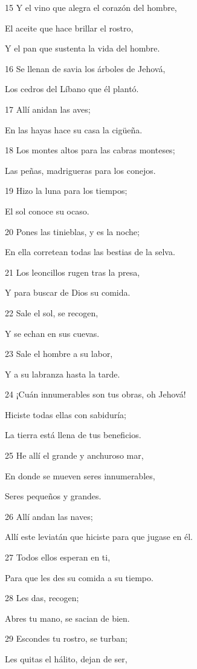 \par 15 Y el vino que alegra el corazón del hombre,
\par El aceite que hace brillar el rostro,
\par Y el pan que sustenta la vida del hombre.
\par 16 Se llenan de savia los árboles de Jehová,
\par Los cedros del Líbano que él plantó.
\par 17 Allí anidan las aves;
\par En las hayas hace su casa la cigüeña.
\par 18 Los montes altos para las cabras monteses;
\par Las peñas, madrigueras para los conejos.
\par 19 Hizo la luna para los tiempos;
\par El sol conoce su ocaso.
\par 20 Pones las tinieblas, y es la noche;
\par En ella corretean todas las bestias de la selva.
\par 21 Los leoncillos rugen tras la presa,
\par Y para buscar de Dios su comida.
\par 22 Sale el sol, se recogen,
\par Y se echan en sus cuevas.
\par 23 Sale el hombre a su labor,
\par Y a su labranza hasta la tarde.
\par 24 ¡Cuán innumerables son tus obras, oh Jehová!
\par Hiciste todas ellas con sabiduría;
\par La tierra está llena de tus beneficios.
\par 25 He allí el grande y anchuroso mar,
\par En donde se mueven seres innumerables,
\par Seres pequeños y grandes.
\par 26 Allí andan las naves;
\par Allí este leviatán que hiciste para que jugase en él.
\par 27 Todos ellos esperan en ti,
\par Para que les des su comida a su tiempo.
\par 28 Les das, recogen;
\par Abres tu mano, se sacian de bien.
\par 29 Escondes tu rostro, se turban;
\par Les quitas el hálito, dejan de ser,
